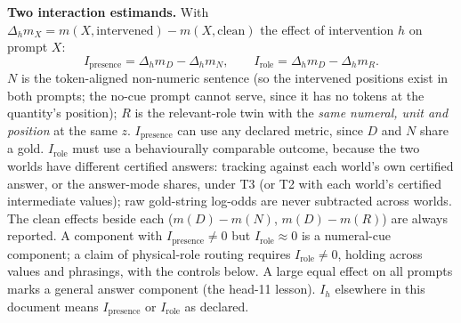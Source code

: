 \documentclass[10pt,a4paper]{article}
\begin{document}
\textbf{Two interaction estimands.} With $\Delta_h m_X=m(X,\text{intervened})-m(X,\text{clean})$ the effect of
intervention $h$ on prompt $X$:
\[
I_{\text{presence}}=\Delta_h m_D-\Delta_h m_N,\qquad I_{\text{role}}=\Delta_h m_D-\Delta_h m_R .
\]
$N$ is the token-aligned non-numeric sentence (so the intervened positions exist in both prompts; the no-cue prompt
cannot serve, since it has no tokens at the quantity's position); $R$ is the relevant-role twin with the
\emph{same numeral, unit and position} at the same $z$. $I_{\text{presence}}$ can use any declared metric, since
$D$ and $N$ share a gold. $I_{\text{role}}$ must use a behaviourally comparable outcome, because the two worlds
have different certified answers: tracking against each world's own certified answer, or the answer-mode shares,
under T3 (or T2 with each world's certified intermediate values); raw gold-string log-odds are never subtracted
across worlds. The clean effects beside each ($m(D)-m(N)$, $m(D)-m(R)$) are always reported. A component with
$I_{\text{presence}}\neq0$ but $I_{\text{role}}\approx0$ is a numeral-cue component; a claim of physical-role
routing requires $I_{\text{role}}\neq0$, holding across values and phrasings, with the controls below. A large equal
effect on all prompts marks a general answer component (the head-11 lesson). $I_h$ elsewhere in this document
means $I_{\text{presence}}$ or $I_{\text{role}}$ as declared.
\end{document}
